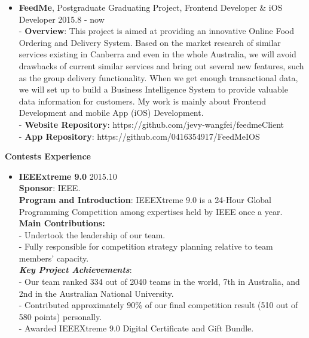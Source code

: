 \documentclass{res}
\newcommand{\resheading}[1]{{\normalsize \colorbox{mygrey}{\begin{minipage}{\textwidth}{\textbf{#1 \vphantom{p\^{E}}}}\end{minipage}}}}
\begin{document}
\begin{resume}
\begin{CJK*}{UTF8}{song}
\begin{itemize}
	\item {\bf FeedMe}, Postgraduate Graduating Project, Frontend Developer $\&$ iOS Developer \hfill 2015.8 - now	\vspace{3pt} \\
- \textbf{Overview}: This project is aimed at providing an innovative Online Food Ordering and Delivery System. Based on the market research of similar services existing in Canberra and even in the whole Australia, we will avoid drawbacks of current similar services and bring out several new features, such as the group delivery functionality. When we get enough transactional data, we will set up to build a Business Intelligence System to provide valuable data information for customers. My work is mainly about Frontend Development and mobile App (iOS) Development. \vspace{2pt} \\
- \textbf{Website Repository}: https://github.com/jevy-wangfei/feedmeClient \vspace{2pt} \\
- \textbf{App Repository}: https://github.com/0416354917/FeedMeIOS 
\end{itemize}



\resheading{Contests Experience}

\begin{itemize}

\itemsep -2pt %
  \item{\bf IEEExtreme 9.0} \hfill 2015.10 \vspace{3pt} \\
		\textbf{Sponsor}: IEEE. \vspace{3pt} \\
		\textbf{Program and Introduction}: IEEEXtreme 9.0 is a 24-Hour Global Programming Competition among expertises held by IEEE once a year. \vspace{3pt} \\
		\textbf{Main Contributions:} \vspace{3pt} \\
		- Undertook the leadership of our team. \\
		- Fully responsible for competition strategy planning relative to team members' capacity. \vspace{3pt} \\		
		\textit{\textbf{Key Project Achievements}}: \vspace{3pt} \\
		- Our team ranked 334 out of 2040 teams in the world, 7th in Australia, and 2nd in the Australian National University. \\
		- Contributed approximately $90\%$ of our final competition result (510 out of 580 points) personally. \\
		- Awarded IEEEXtreme 9.0 Digital Certificate and Gift Bundle. \\
        

\end{itemize}
\end{CJK*}
\end{resume}
\end{document}
